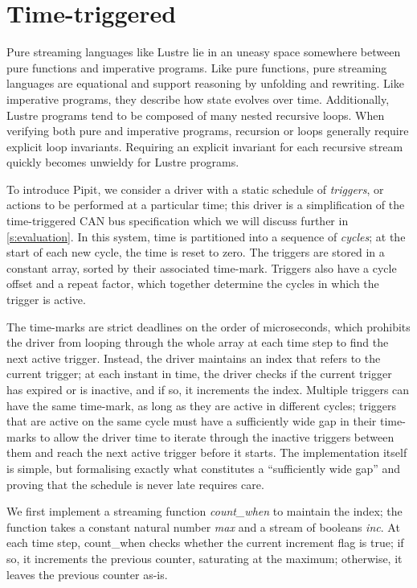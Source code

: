 
\section{Time-triggered}
\label{s:motivation}

Pure streaming languages like Lustre lie in an uneasy space somewhere between pure functions and imperative programs.
Like pure functions, pure streaming languages are equational and support reasoning by unfolding and rewriting.
Like imperative programs, they describe how state evolves over time.
Additionally, Lustre programs tend to be composed of many nested recursive loops.
When verifying both pure and imperative programs, recursion or loops generally require explicit loop invariants.
Requiring an explicit invariant for each recursive stream quickly becomes unwieldy for Lustre programs.

To introduce Pipit, we consider a driver with a static schedule of \emph{triggers}, or actions to be performed at a particular time; this driver is a simplification of the time-triggered CAN bus specification \cite{fuehrer2001time} which we will discuss further in \autoref{s:evaluation}.
In this system, time is partitioned into a sequence of \emph{cycles}; at the start of each new cycle, the time is reset to zero.
The triggers are stored in a constant array, sorted by their associated time-mark.
Triggers also have a cycle offset and a repeat factor, which together determine the cycles in which the trigger is active.

The time-marks are strict deadlines on the order of microseconds, which prohibits the driver from looping through the whole array at each time step to find the next active trigger.
Instead, the driver maintains an index that refers to the current trigger; at each instant in time, the driver checks if the current trigger has expired or is inactive, and if so, it increments the index.
Multiple triggers can have the same time-mark, as long as they are active in different cycles; triggers that are active on the same cycle must have a sufficiently wide gap in their time-marks to allow the driver time to iterate through the inactive triggers between them and reach the next active trigger before it starts.
The implementation itself is simple, but formalising exactly what constitutes a ``sufficiently wide gap'' and proving that the schedule is never late requires care.

We first implement a streaming function \emph{count_when} to maintain the index; the function takes a constant natural number \emph{max} and a stream of booleans \emph{inc}.
At each time step, count_when checks whether the current increment flag is true; if so, it increments the previous counter, saturating at the maximum; otherwise, it leaves the previous counter as-is.


